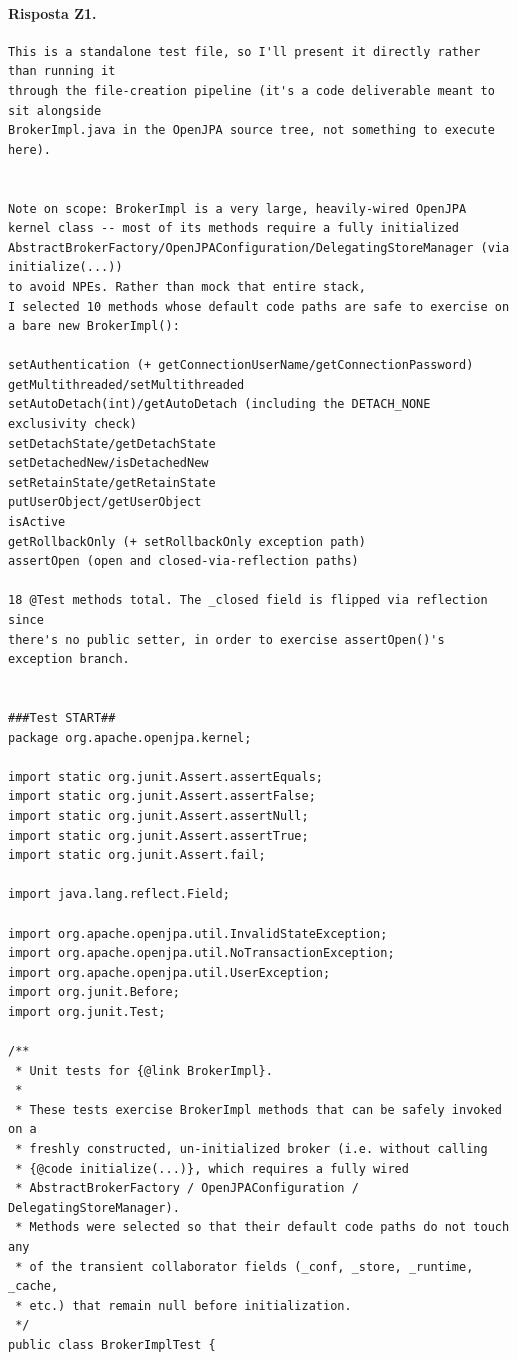 \paragraph*{Risposta Z1.}
\label{risposta:z1}
\begin{lstlisting}
This is a standalone test file, so I'll present it directly rather than running it
through the file-creation pipeline (it's a code deliverable meant to sit alongside
BrokerImpl.java in the OpenJPA source tree, not something to execute here).


Note on scope: BrokerImpl is a very large, heavily-wired OpenJPA
kernel class -- most of its methods require a fully initialized
AbstractBrokerFactory/OpenJPAConfiguration/DelegatingStoreManager (via initialize(...))
to avoid NPEs. Rather than mock that entire stack,
I selected 10 methods whose default code paths are safe to exercise on a bare new BrokerImpl():

setAuthentication (+ getConnectionUserName/getConnectionPassword)
getMultithreaded/setMultithreaded
setAutoDetach(int)/getAutoDetach (including the DETACH_NONE exclusivity check)
setDetachState/getDetachState
setDetachedNew/isDetachedNew
setRetainState/getRetainState
putUserObject/getUserObject
isActive
getRollbackOnly (+ setRollbackOnly exception path)
assertOpen (open and closed-via-reflection paths)

18 @Test methods total. The _closed field is flipped via reflection since
there's no public setter, in order to exercise assertOpen()'s exception branch.


###Test START##
package org.apache.openjpa.kernel;

import static org.junit.Assert.assertEquals;
import static org.junit.Assert.assertFalse;
import static org.junit.Assert.assertNull;
import static org.junit.Assert.assertTrue;
import static org.junit.Assert.fail;

import java.lang.reflect.Field;

import org.apache.openjpa.util.InvalidStateException;
import org.apache.openjpa.util.NoTransactionException;
import org.apache.openjpa.util.UserException;
import org.junit.Before;
import org.junit.Test;

/**
 * Unit tests for {@link BrokerImpl}.
 *
 * These tests exercise BrokerImpl methods that can be safely invoked on a
 * freshly constructed, un-initialized broker (i.e. without calling
 * {@code initialize(...)}, which requires a fully wired
 * AbstractBrokerFactory / OpenJPAConfiguration / DelegatingStoreManager).
 * Methods were selected so that their default code paths do not touch any
 * of the transient collaborator fields (_conf, _store, _runtime, _cache,
 * etc.) that remain null before initialization.
 */
public class BrokerImplTest {


\end{lstlisting}

